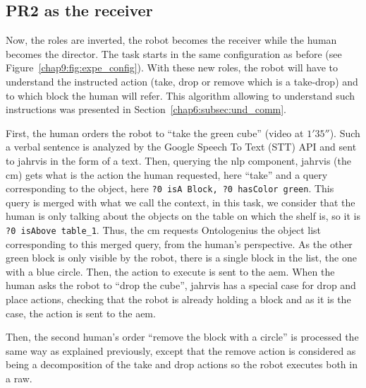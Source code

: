 \documentclass[a4paper,11pt,twoside]{StyleThese}
\begin{document}
\newpage

\subsection{PR2 as the receiver}

Now, the roles are inverted, the robot becomes the receiver while the human becomes the director. The task starts in the same configuration as before (see Figure~\ref{chap9:fig:expe_config}). With these new roles, the robot will have to understand the instructed action (take, drop or remove which is a take-drop) and to which block the human will refer. This algorithm allowing to understand such instructions was presented in Section~\ref{chap6:subsec:und_comm}.

First, the human orders the robot to ``take the green cube'' (video at $1'35''$). Such a verbal sentence is analyzed by the Google Speech To Text (STT) API and sent to \acrshort{jahrvis} in the form of a text. Then, querying the \acrshort{nlp} component, \acrshort{jahrvis} (the \acrfull{cm}) gets what is the action the human requested, here ``take'' and a \sparql{} query corresponding to the object, here \verb'?0 isA Block, ?0 hasColor green'. This query is merged with what we call the context, \ie in this task, we consider that the human is only talking about the objects on the table on which the shelf is, so it is \verb'?0 isAbove table_1'. Thus, the \acrshort{cm} requests Ontologenius the object list corresponding to this merged query, from the human's perspective. As the other green block is only visible by the robot, there is a single block in the list, \ie the one with a blue circle. Then, the action to execute is sent to the \acrfull{aem}. When the human asks the robot to ``drop the cube'', \acrshort{jahrvis} has a special case for drop and place actions, checking that the robot is already holding a block and as it is the case, the action is sent to the \acrshort{aem}.

Then, the second human's order ``remove the block with a circle'' is processed the same way as explained previously, except that the remove action is considered as being a decomposition of the take and drop actions so the robot executes both in a raw.
\end{document}
